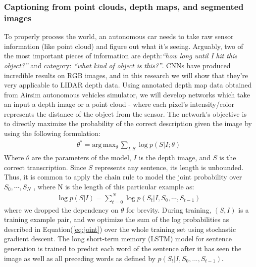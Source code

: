 \subsubsection{Captioning from point clouds, depth maps, and segmented images}
\label{subsec:point_cloud}

To properly process the world, an autonomous car needs to take raw sensor information (like point cloud) and figure out what it’s seeing.
Arguably, two of the most important pieces of information are depth:\textit{``how long until I hit this object?''} and category: \textit{``what kind of object is this?''}.
CNNs have produced incredible results on RGB images, and in this research we will show that they're very applicable to LIDAR depth data.
Using annotated depth map data obtained from Airsim autonomous vehicles simulator, we will develop networks which take an input a depth image or a point cloud - where each pixel's intensity/color represents the distance of the object from the sensor. 
The network's objective is to directly maximize the probability of the correct description given the image by using the following
formulation:
\begin{align}
     \theta^* = \text{arg} \, \text{max}_{\theta} \, \sum_{I,S} \log p(S|I;\theta)
\end{align}
Where $\theta$ are the parameters of the model, $I$ is the depth image, and $S$ is the correct transcription.  Since $S$ represents any sentence, its length is unbounded. Thus, it is common to apply the chain rule to model the joint probability over $S_0, \cdots, S_N$ , where N is the length of this particular example as:
\begin{align}
     \log p(S|I) = \sum_{t=0}^{N} \log p(S_t|I, S_0, \cdots, S_{t-1})
     \label{eq:joint}
\end{align}
where we dropped the dependency on $\theta$ for brevity.
During training, $(S, I)$ is a training example pair, and we optimize the sum of the log probabilities as described in Equation(\ref{eq:joint}) over the whole training set using stochastic gradient descent.
The long short-term memory (LSTM) model for sentence generation is trained to predict each word of the sentence after it has seen the image as well as all preceding words as defined by $p(S_t|I, S_0, . . . , S_{t-1})$.
